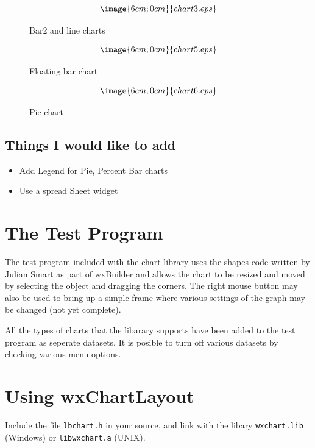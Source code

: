 \begin{figure}
$$\image{6cm;0cm}{chart3.eps}$$
\caption{Bar2 and line charts}
\end{figure}

\begin{figure}
$$\image{6cm;0cm}{chart5.eps}$$
\caption{Floating bar chart}
\end{figure}

\begin{figure}
$$\image{6cm;0cm}{chart6.eps}$$
\caption{Pie chart}
\end{figure}

\section{Things I would like to add}

\begin{itemize}\itemsep=0pt
\item Add Legend for Pie, Percent Bar charts
\item Use a spread Sheet widget
\end{itemize}

\chapter{The Test Program}
%
\setfooter{\thepage}{}{}{}{}{\thepage}

The test program included with the chart library uses the shapes code
written by Julian Smart as part of wxBuilder and allows the chart to be
resized and moved by selecting the object and dragging the corners. The
right mouse button may also be used to bring up a simple frame where
various settings of the graph may be changed (not yet complete). 

All the types of charts that the libarary supports have been added to
the test program as seperate datasets. It is posible to turn off various
datasets by checking various menu options. 

\chapter{Using wxChartLayout}%
%
\setfooter{\thepage}{}{}{}{}{\thepage}

Include the file {\tt lbchart.h} in your source, and link with the
libary {\tt wxchart.lib} (Windows) or {\tt libwxchart.a} (UNIX).




%
\setfooter{\thepage}{}{}{}{}{\thepage}%
\printindex

